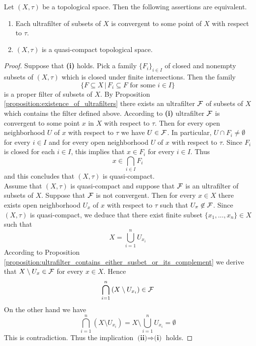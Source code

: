 \begin{theorem}\label{theorem:quasi_compact_in_terms_of_ultrafilters}
Let $(X,\tau)$ be a topological space. Then the following assertions are equivalent.
\begin{enumerate}[label=\emph{\textbf{(\roman*)}}, leftmargin=*]
\item Each ultrafilter of subsets of $X$ is convergent to some point of $X$ with respect to $\tau$.
\item $(X,\tau)$ is a quasi-compact topological space.
\end{enumerate}
\end{theorem}
\begin{proof}
Suppose that \textbf{(i)} holds. Pick a family $\{F_i\}_{i\in I}$ of closed and nonempty subsets of $\left(X,\tau\right)$ which is closed under finite intersections. Then the family
$$\big\{F\subseteq X\,\big|\,F_i\subseteq F\mbox{ for some }i\in I\big\}$$
is a proper filter of subsets of $X$. By Proposition \ref{proposition:existence_of_ultrafilters} there exists an ultrafilter ${\mathcal F}$ of subsets of $X$ which contains the filter defined above. According to \textbf{(i)} ultrafilter ${\mathcal F}$ is convergent to some point $x$ in $X$ with respect to $\tau$. Then for every open neighborhood $U$ of $x$ with respect to $\tau$ we have $U \in {\mathcal F}$. In particular, $U\cap F_i \neq \emptyset$ for every $i\in I$ and for every open neighborhood $U$ of $x$ with respect to $\tau$. Since $F_i$ is closed for each $i\in I$, this implies that $x \in F_i$ for every $i \in I$. Thus
$$x \in  \bigcap_{i\in I}F_i$$
and this concludes that $\left(X,\tau\right)$ is quasi-compact.\\
Assume that $(X,\tau)$ is quasi-compact and suppose that ${\mathcal F}$ is an ultrafilter of subsets of $X$. Suppose that ${\mathcal F}$ is not convergent. Then for every $x \in X$ there exists open neighborhood $U_x$ of $x$ with respect to $\tau$ such that $U_x \not \in {\mathcal F}$. Since $\left(X,\tau\right)$ is quasi-compact, we deduce that there exist finite subset $\{x_1,...,x_n\} \in X$ such that 
$$X = \bigcup_{i=1}^nU_{x_i}$$
According to Proposition \ref{proposition:ultrafilter_contains_either_susbet_or_its_complement} we derive that $X\setminus U_x \in {\mathcal F}$ for every $x \in X$. Hence
$$\bigcap_{i=1}^n\left(X\setminus U_{x_i}\right) \in {\mathcal F}$$
On the other hand we have
$$\bigcap_{i=1}^n\left(X\setminus U_{x_i}\right) = X \setminus \bigcup_{i=1}^nU_{x_i} = \emptyset$$
This is contradiction. Thus the implication $\textbf{(ii)}\Rightarrow \textbf{(i)}$ holds.
\end{proof}

